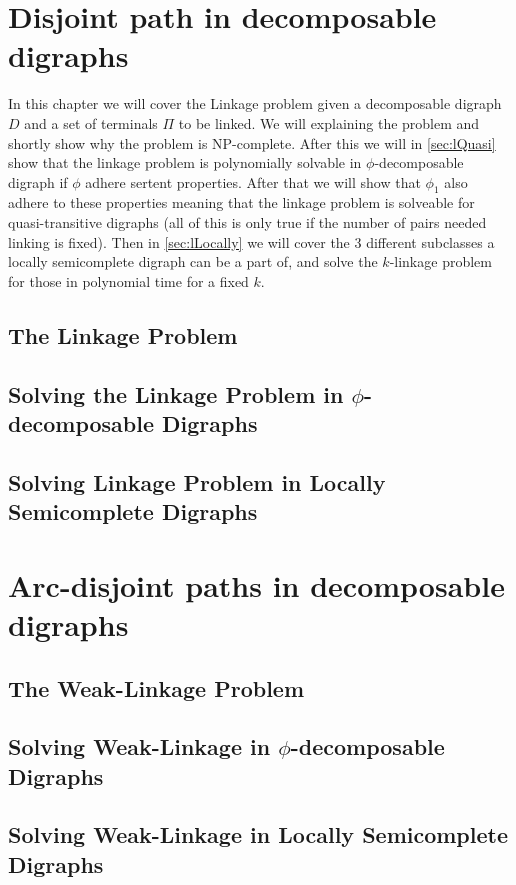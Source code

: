 \chapter{Disjoint path in decomposable digraphs}
\label{chap:linkage}
In this chapter we will cover the Linkage problem given a decomposable digraph $D$ and a set of terminals $\Pi$ to be linked. 
We will explaining the problem and shortly show why the problem is NP-complete. 
After this we will in \autoref{sec:lQuasi} show that the linkage problem is polynomially solvable in $\phi$-decomposable digraph if $\phi$ adhere sertent properties. 
After that we will show that $\phi_1$ also adhere to these properties meaning that the linkage problem is solveable for quasi-transitive digraphs (all of this is only true if the number of pairs needed linking is fixed). Then in \autoref{sec:lLocally} we will cover the 3 different subclasses a locally semicomplete digraph can be a part of, and solve the $k$-linkage problem for those in polynomial time for a fixed $k$. 
\section{The Linkage Problem}
\label{sec:lNP}


\section{Solving the Linkage Problem in $\phi$-decomposable Digraphs}
\label{sec:lQuasi}


\section{Solving Linkage Problem in Locally Semicomplete Digraphs}
\label{sec:lLocally}


\chapter{Arc-disjoint paths in decomposable digraphs}
\label{chap:weak}

\section{The Weak-Linkage Problem}
\label{sec:wNP}


\section{Solving Weak-Linkage in $\phi$-decomposable Digraphs}
\label{sec:wQuasi}


\section{Solving Weak-Linkage in Locally Semicomplete Digraphs}
\label{sec:wLocally}


